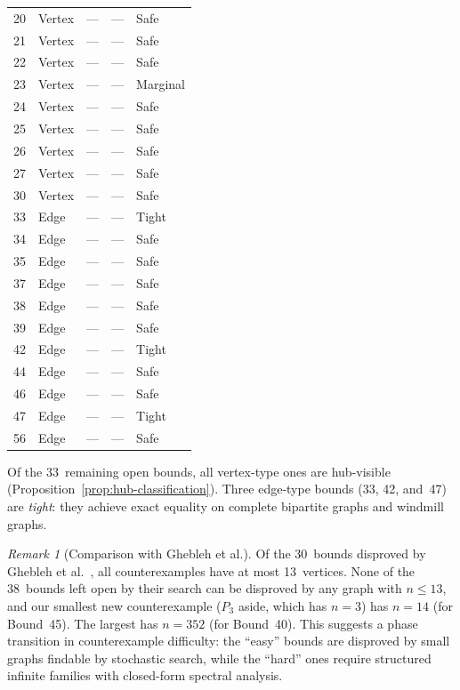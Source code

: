 \documentclass[preprint,12pt]{elsarticle}
\theoremstyle{definition}
\theoremstyle{remark}
\newtheorem{remark}[theorem]{Remark}
\begin{document}
\begin{table}[ht]
{\begin{tabular}{lllll}
    20  & Vertex & ---         & --- & Safe \\
    21  & Vertex & ---         & --- & Safe \\
    22  & Vertex & ---         & --- & Safe \\
    23  & Vertex & ---         & --- & Marginal \\
    24  & Vertex & ---         & --- & Safe \\
    25  & Vertex & ---         & --- & Safe \\
    26  & Vertex & ---         & --- & Safe \\
    27  & Vertex & ---         & --- & Safe \\
    30  & Vertex & ---         & --- & Safe \\
    33  & Edge   & ---         & --- & Tight \\
    34  & Edge   & ---         & --- & Safe \\
    35  & Edge   & ---         & --- & Safe \\
    37  & Edge   & ---         & --- & Safe \\
    38  & Edge   & ---         & --- & Safe \\
    39  & Edge   & ---         & --- & Safe \\
    42  & Edge   & ---         & --- & Tight \\
    44  & Edge   & ---         & --- & Safe \\
    46  & Edge   & ---         & --- & Safe \\
    47  & Edge   & ---         & --- & Tight \\
    56  & Edge   & ---         & --- & Safe \\
    \bottomrule
  \end{tabular}%
  }
\end{table}

\noindent
Of the 33~remaining open bounds, all vertex-type ones are hub-visible
(Proposition~\ref{prop:hub-classification}).  Three edge-type bounds
(33, 42, and~47) are \emph{tight}: they achieve exact equality on complete
bipartite graphs and windmill graphs.

\begin{remark}[Comparison with Ghebleh et al.]\label{rem:ghebleh-comparison}
  Of the 30~bounds disproved by Ghebleh et al.~\cite{Ghebleh2024},
  all counterexamples have at most 13~vertices.  None of the 38~bounds
  left open by their search can be disproved by any graph with $n \leq 13$,
  and our smallest new counterexample ($P_3$ aside, which has $n = 3$) has
  $n = 14$ (for Bound~45).  The largest has $n = 352$ (for Bound~40).
  This suggests a phase transition in counterexample difficulty: the
  ``easy'' bounds are disproved by small graphs findable by stochastic
  search, while the ``hard'' ones require structured infinite families
  with closed-form spectral analysis.
\end{remark}
\end{document}
